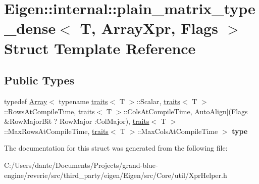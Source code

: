 \hypertarget{struct_eigen_1_1internal_1_1plain__matrix__type__dense_3_01_t_00_01_array_xpr_00_01_flags_01_4}{}\section{Eigen\+::internal\+::plain\+\_\+matrix\+\_\+type\+\_\+dense$<$ T, Array\+Xpr, Flags $>$ Struct Template Reference}
\label{struct_eigen_1_1internal_1_1plain__matrix__type__dense_3_01_t_00_01_array_xpr_00_01_flags_01_4}
\subsection*{Public Types}
\begin{DoxyCompactItemize}
\item 
\mbox{\label{struct_eigen_1_1internal_1_1plain__matrix__type__dense_3_01_t_00_01_array_xpr_00_01_flags_01_4_a4c8902a98a8b6916b3466afcda8d916b}} 
typedef \mbox{\hyperlink{class_eigen_1_1_array}{Array}}$<$ typename \mbox{\hyperlink{struct_eigen_1_1internal_1_1traits}{traits}}$<$ T $>$\+::Scalar, \mbox{\hyperlink{struct_eigen_1_1internal_1_1traits}{traits}}$<$ T $>$\+::Rows\+At\+Compile\+Time, \mbox{\hyperlink{struct_eigen_1_1internal_1_1traits}{traits}}$<$ T $>$\+::Cols\+At\+Compile\+Time, Auto\+Align$\vert$(Flags \&Row\+Major\+Bit ? Row\+Major \+:Col\+Major), \mbox{\hyperlink{struct_eigen_1_1internal_1_1traits}{traits}}$<$ T $>$\+::Max\+Rows\+At\+Compile\+Time, \mbox{\hyperlink{struct_eigen_1_1internal_1_1traits}{traits}}$<$ T $>$\+::Max\+Cols\+At\+Compile\+Time $>$ {\bfseries type}
\end{DoxyCompactItemize}


The documentation for this struct was generated from the following file\+:\begin{DoxyCompactItemize}
\item 
C\+:/\+Users/dante/\+Documents/\+Projects/grand-\/blue-\/engine/reverie/src/third\+\_\+party/eigen/\+Eigen/src/\+Core/util/Xpr\+Helper.\+h\end{DoxyCompactItemize}
